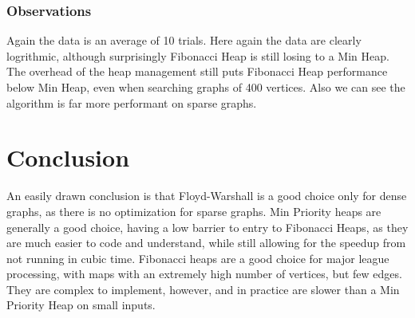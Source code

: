 \documentclass[a4paper,12pt]{article}
\begin{document}
\subsubsection{Observations}
Again the data is an average of 10 trials. Here again the data are clearly logrithmic, although surprisingly Fibonacci Heap is still losing to a Min Heap. The overhead of the heap management still puts Fibonacci Heap performance below Min Heap, even when searching graphs of 400 vertices. Also we can see the algorithm is far more performant on sparse graphs.
\section{Conclusion}
An easily drawn conclusion is that Floyd-Warshall is a good choice only for dense graphs, as there is no optimization for sparse graphs. Min Priority heaps are generally a good choice, having a low barrier to entry to Fibonacci Heaps, as they are much easier to code and understand, while still allowing for the speedup from not running in cubic time. Fibonacci heaps are a good choice for major league processing, with maps with an extremely high number of vertices, but few edges. They are complex to implement, however, and in practice are slower than a Min Priority Heap on small inputs.
\end{document}
